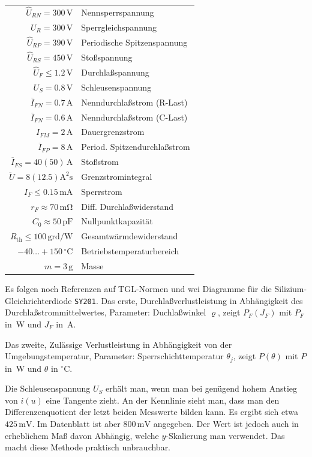 \documentclass[a4paper,10pt,fleqn,twocolumn,twoside]{article}
\numberwithin{equation}{section}
\begin{document}
\begin{tabular}{r|l}
$\hat U_{RN} = 300\,\mathrm{V}$ & Nennsperrspannung\\
$U_R = 300\,\mathrm{V}$ & Sperrgleichspannung\\
$\hat U_{RP} = 390\,\mathrm{V}$ & Periodische Spitzenspannung\\
$\hat U_{RS} = 450\,\mathrm{V}$ & Stoßspannung\\
\hline
$\hat U_F \le 1.2\,\mathrm{V}$ & Durchlaßspannung\\
$U_S = 0.8\,\mathrm{V}$ & Schleusenspannung\\
$\overline I_{FN} = 0.7\,\mathrm{A}$
  & Nenndurchlaßstrom (R-Last)\\
$\overline I_{FN} = 0.6\,\mathrm{A}$
  & Nenndurchlaßstrom (C-Last)\\
\hline
$I_{FM} = 2\,\mathrm{A}$ & Dauergrenzstrom\\
$\overline I_{FP}=8\,\mathrm{A}$
  & Period. Spitzendurchlaßstrom\\
$\overline I_{FS}=40(50)\,\mathrm{A}$
  & Stoßstrom\\
$\ddot U = 8(12.5)\mathrm{A^2 s}$
  & Grenzstromintegral\\
\hline
$I_F \le 0.15\,\mathrm{mA}$ & Sperrstrom\\
$r_F \approx 70\,\mathrm{m\Omega}$
  & Diff. Durchlaßwiderstand\\
$C_0 \approx 50\,\mathrm{pF}$
  & Nullpunktkapazität\\
$R_{\mathrm{th}}{\le}100\,\mathrm{grd/W}$
  & Gesamtwärmdewiderstand\\
\hline
$-40{\ldots}{+}150\,\mathrm{{}^\circ C}$
  & Betriebstemperaturbereich\\
$m=3\,\mathrm{g}$ & Masse
\end{tabular}
Es folgen noch Referenzen auf TGL-Normen und
wei Diagramme für die Silizium-Gleichrichterdiode \texttt{SY201}.
Das erste, {\glqq}Durchlaßverlustleistung in Abhängigkeit des
Durchlaßstrommittelwertes, Parameter: Duchlaßwinkel
$\varrho${\grqq}, zeigt  $P_F(J_F)$ mit $P_F$ in~W und $J_F$ in~A.

Das zweite, {\glqq}Zulässige Verlustleistung
in Abhängigkeit von der Umgebungstemperatur, Parameter:
Sperrschichttemperatur $\theta_j${\grqq}, zeigt $P(\theta)$
mit $P$ in~W und $\theta$ in ${}^\circ\mathrm{C}$.

Die Schleusenspannung $U_S$ erhält man,
wenn man bei genügend hohem Anstieg von $i(u)$ eine Tangente
zieht. An der Kennlinie sieht man, dass man den Differenzenquotient
der letzt beiden Messwerte bilden kann. Es ergibt sich etwa
$425\,\mathrm{mV}$. Im Datenblatt ist aber $800\,\mathrm{mV}$
angegeben. Der Wert ist jedoch auch in erheblichem
Maß davon Abhängig, welche $y$-Skalierung man verwendet.
Das macht diese Methode praktisch unbrauchbar.
\end{document}
